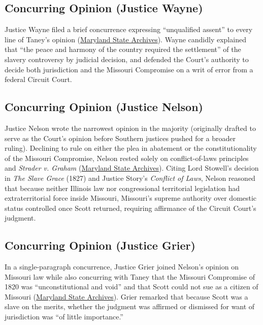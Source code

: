 \documentclass[12pt]{article}
\begin{document}
\subsection{Concurring Opinion (Justice Wayne)}

Justice Wayne filed a brief concurrence expressing ``unqualified assent'' to every line of Taney's opinion (\href{https://msa.maryland.gov/megafile/msa/speccol/sc5300/sc5339/000091/000000/000004/restricted/dred_scott/decision/wayne.html}{Maryland State Archives}). Wayne candidly explained that ``the peace and harmony of the country required the settlement'' of the slavery controversy by judicial decision, and defended the Court's authority to decide both jurisdiction and the Missouri Compromise on a writ of error from a federal Circuit Court.

\subsection{Concurring Opinion (Justice Nelson)}

Justice Nelson wrote the narrowest opinion in the majority (originally drafted to serve as the Court's opinion before Southern justices pushed for a broader ruling). Declining to rule on either the plea in abatement or the constitutionality of the Missouri Compromise, Nelson rested solely on conflict-of-laws principles and \textit{Strader v. Graham} (\href{https://msa.maryland.gov/megafile/msa/speccol/sc5300/sc5339/000091/000000/000004/restricted/dred_scott/decision/nelson.html}{Maryland State Archives}). Citing Lord Stowell's decision in \textit{The Slave Grace} (1827) and Justice Story's \textit{Conflict of Laws}, Nelson reasoned that because neither Illinois law nor congressional territorial legislation had extraterritorial force inside Missouri, Missouri's supreme authority over domestic status controlled once Scott returned, requiring affirmance of the Circuit Court's judgment.

\subsection{Concurring Opinion (Justice Grier)}

In a single-paragraph concurrence, Justice Grier joined Nelson's opinion on Missouri law while also concurring with Taney that the Missouri Compromise of 1820 was ``unconstitutional and void'' and that Scott could not sue as a citizen of Missouri (\href{https://msa.maryland.gov/megafile/msa/speccol/sc5300/sc5339/000091/000000/000004/restricted/dred_scott/decision/grier.html}{Maryland State Archives}). Grier remarked that because Scott was a slave on the merits, whether the judgment was affirmed or dismissed for want of jurisdiction was ``of little importance.''
\end{document}
